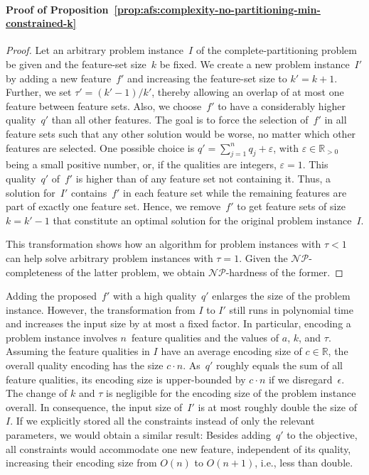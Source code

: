 \documentclass{article}
\theoremstyle{definition}
\begin{document}
\paragraph{Proof of Proposition~\ref{prop:afs:complexity-no-partitioning-min-constrained-k}}
%
\begin{proof}
Let an arbitrary problem instance~$I$ of the complete-partitioning problem be given and the feature-set size~$k$ be fixed.
We create a new problem instance~$I'$ by adding a new feature~$f'$ and increasing the feature-set size to $k' = k + 1$.
Further, we set $\tau' = (k' - 1) / k'$, thereby allowing an overlap of at most one feature between feature sets.
Also, we choose~$f'$ to have a considerably higher quality~$q'$ than all other features.
The goal is to force the selection of~$f'$ in all feature sets such that any other solution would be worse, no matter which other features are selected.
One possible choice is $q' = \sum_{j=1}^n q_j + \varepsilon$, with $\varepsilon \in \mathbb{R}_{> 0}$ being a small positive number, or, if the qualities are integers, $\varepsilon = 1$.
This quality~$q'$ of~$f'$ is higher than of any feature set not containing it.
Thus, a solution for~$I'$ contains~$f'$ in each feature set while the remaining features are part of exactly one feature set.
Hence, we remove~$f'$ to get feature sets of size~$k = k' - 1$ that constitute an optimal solution for the original problem instance~$I$.
	
This transformation shows how an algorithm for problem instances with $\tau < 1$ can help solve arbitrary problem instances with $\tau = 1$.
Given the $\mathcal{NP}$-completeness of the latter problem, we obtain $\mathcal{NP}$-hardness of the former.
\end{proof}
%
Adding the proposed~$f'$ with a high quality~$q'$ enlarges the size of the problem instance.
However, the transformation from $I$ to $I'$ still runs in polynomial time and increases the input size by at most a fixed factor.
In particular, encoding a problem instance involves $n$~feature qualities and the values of $a$, $k$, and $\tau$.
Assuming the feature qualities in $I$ have an average encoding size of $c \in \mathbb{R}$, the overall quality encoding has the size $c \cdot n$.
As~$q'$ roughly equals the sum of all feature qualities, its encoding size is upper-bounded by $c \cdot n$ if we disregard~$\epsilon$.
The change of $k$ and $\tau$ is negligible for the encoding size of the problem instance overall.
In consequence, the input size of~$I'$ is at most roughly double the size of~$I$.
If we explicitly stored all the constraints instead of only the relevant parameters, we would obtain a similar result:
Besides adding~$q'$ to the objective, all constraints would accommodate one new feature, independent of its quality, increasing their encoding size from $O(n)$ to $O(n+1)$, i.e., less than double.
\end{document}

